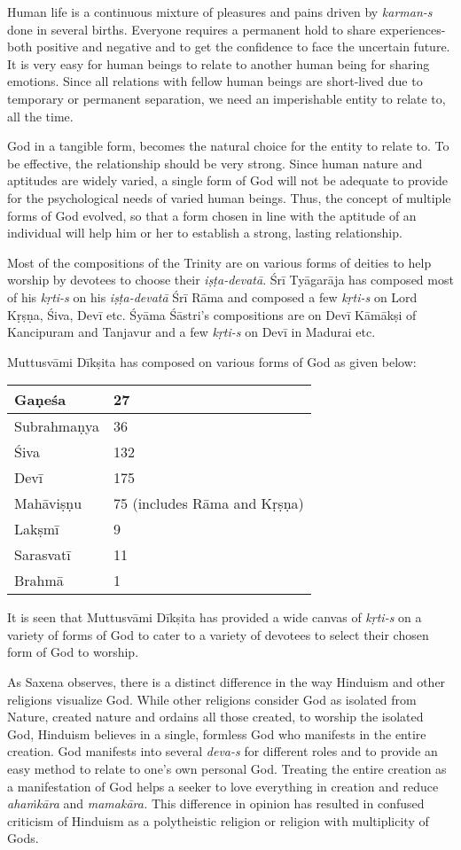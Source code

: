 Human life is a continuous mixture of pleasures and pains driven by \textit{karman-s} done in several births. Everyone requires a permanent hold to share experiences- both positive and negative and to get the confidence to face the uncertain future. It is very easy for human beings to relate to another human being for sharing emotions. Since all relations with fellow human beings are short-lived due to temporary or permanent separation, we need an imperishable entity to relate to, all the time.

God in a tangible form, becomes the natural choice for the entity to relate to. To be effective, the relationship should be very strong. Since human nature and aptitudes are widely varied, a single form of God will not be adequate to provide for the psychological needs of varied human beings. Thus, the concept of multiple forms of God evolved, so that a form chosen in line with the aptitude of an individual will help him or her to establish a strong, lasting relationship.

Most of the compositions of the Trinity are on various forms of deities to help worship by devotees to choose their \textit{iṣṭa-devatā}. Śrī Tyāgarāja has composed most of his \textit{kṛti-s} on his \textit{iṣṭa-devatā} Śrī Rāma and composed a few \textit{kṛti-s} on Lord Kṛṣṇa, Śiva, Devī etc. Śyāma Śāstri’s compositions are on Devī Kāmākṣi of Kancipuram and Tanjavur and a few \textit{kṛti-s} on Devī in Madurai etc.

Muttusvāmi Dīkṣita has composed on various forms of God as given below:

\begin{longtable}{|l|l|}
\hline
Gaṇeśa & 27 \\
\hline
Subrahmaṇya & 36 \\
\hline
Śiva & 132 \\
\hline
Devī & 175 \\
\hline
Mahāviṣṇu & 75 (includes Rāma and Kṛṣṇa) \\
\hline
Lakṣmī & 9 \\
\hline
Sarasvatī & 11 \\
\hline
Brahmā & 1 \\
\hline
\end{longtable}

It is seen that Muttusvāmi Dīkṣita has provided a wide canvas of \textit{kṛti-s} on a variety of forms of God to cater to a variety of devotees to select their chosen form of God to worship.

As Saxena observes, there is a distinct difference in the way Hinduism and other religions visualize God. While other religions consider God as isolated from Nature, created nature and ordains all those created, to worship the isolated God, Hinduism believes in a single, formless God who manifests in the entire creation. God manifests into several \textit{deva-s} for different roles and to provide an easy method to relate to one’s own personal God. Treating the entire creation as a manifestation of God helps a seeker to love everything in creation and reduce \textit{ahaṁkāra} and \textit{mamakāra.} This difference in opinion has resulted in confused criticism of Hinduism as a polytheistic religion or religion with multiplicity of Gods.


